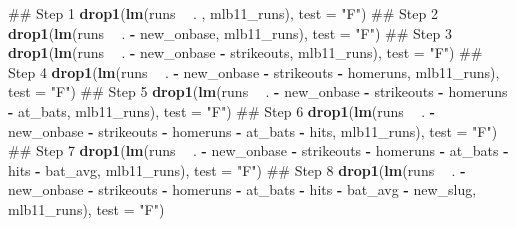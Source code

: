 \documentclass[]{book}
\newenvironment{Shaded}{\begin{snugshade}}{\end{snugshade}}
\newcommand{\KeywordTok}[1]{\textcolor[rgb]{0.13,0.29,0.53}{\textbf{#1}}}
\newcommand{\DataTypeTok}[1]{\textcolor[rgb]{0.13,0.29,0.53}{#1}}
\newcommand{\StringTok}[1]{\textcolor[rgb]{0.31,0.60,0.02}{#1}}
\newcommand{\OperatorTok}[1]{\textcolor[rgb]{0.81,0.36,0.00}{\textbf{#1}}}
\newcommand{\NormalTok}[1]{#1}
\theoremstyle{definition}
\theoremstyle{definition}
\theoremstyle{definition}
\theoremstyle{remark}
\begin{document}
\begin{Shaded}
\begin{Highlighting}[]
\NormalTok{## Step 1}
\KeywordTok{drop1}\NormalTok{(}\KeywordTok{lm}\NormalTok{(runs }\OperatorTok{~}\StringTok{ }\NormalTok{. , mlb11_runs), }\DataTypeTok{test =} \StringTok{"F"}\NormalTok{)}
\NormalTok{## Step 2}
\KeywordTok{drop1}\NormalTok{(}\KeywordTok{lm}\NormalTok{(runs }\OperatorTok{~}\StringTok{ }\NormalTok{. }\OperatorTok{-}\StringTok{ }\NormalTok{new_onbase, mlb11_runs), }\DataTypeTok{test =} \StringTok{"F"}\NormalTok{)}
\NormalTok{## Step 3}
\KeywordTok{drop1}\NormalTok{(}\KeywordTok{lm}\NormalTok{(runs }\OperatorTok{~}\StringTok{ }\NormalTok{. }\OperatorTok{-}\StringTok{ }\NormalTok{new_onbase }\OperatorTok{-}\StringTok{ }\NormalTok{strikeouts, mlb11_runs), }\DataTypeTok{test =} \StringTok{"F"}\NormalTok{)}
\NormalTok{## Step 4}
\KeywordTok{drop1}\NormalTok{(}\KeywordTok{lm}\NormalTok{(runs }\OperatorTok{~}\StringTok{ }\NormalTok{. }\OperatorTok{-}\StringTok{ }\NormalTok{new_onbase }\OperatorTok{-}\StringTok{ }\NormalTok{strikeouts }\OperatorTok{-}\StringTok{ }\NormalTok{homeruns, mlb11_runs), }\DataTypeTok{test =} \StringTok{"F"}\NormalTok{)}
\NormalTok{## Step 5}
\KeywordTok{drop1}\NormalTok{(}\KeywordTok{lm}\NormalTok{(runs }\OperatorTok{~}\StringTok{ }\NormalTok{. }\OperatorTok{-}\StringTok{ }\NormalTok{new_onbase }\OperatorTok{-}\StringTok{ }\NormalTok{strikeouts }\OperatorTok{-}\StringTok{ }\NormalTok{homeruns }\OperatorTok{-}\StringTok{ }\NormalTok{at_bats, mlb11_runs), }\DataTypeTok{test =} \StringTok{"F"}\NormalTok{)}
\NormalTok{## Step 6}
\KeywordTok{drop1}\NormalTok{(}\KeywordTok{lm}\NormalTok{(runs }\OperatorTok{~}\StringTok{ }\NormalTok{. }\OperatorTok{-}\StringTok{ }\NormalTok{new_onbase }\OperatorTok{-}\StringTok{ }\NormalTok{strikeouts }\OperatorTok{-}\StringTok{ }\NormalTok{homeruns }\OperatorTok{-}\StringTok{ }\NormalTok{at_bats }\OperatorTok{-}\StringTok{ }\NormalTok{hits, mlb11_runs), }\DataTypeTok{test =} \StringTok{"F"}\NormalTok{)}
\NormalTok{## Step 7}
\KeywordTok{drop1}\NormalTok{(}\KeywordTok{lm}\NormalTok{(runs }\OperatorTok{~}\StringTok{ }\NormalTok{. }\OperatorTok{-}\StringTok{ }\NormalTok{new_onbase }\OperatorTok{-}\StringTok{ }\NormalTok{strikeouts }\OperatorTok{-}\StringTok{ }\NormalTok{homeruns }\OperatorTok{-}\StringTok{ }\NormalTok{at_bats }\OperatorTok{-}\StringTok{ }\NormalTok{hits  }\OperatorTok{-}\StringTok{ }\NormalTok{bat_avg, mlb11_runs), }\DataTypeTok{test =} \StringTok{"F"}\NormalTok{)}
\NormalTok{## Step 8}
\KeywordTok{drop1}\NormalTok{(}\KeywordTok{lm}\NormalTok{(runs }\OperatorTok{~}\StringTok{ }\NormalTok{. }\OperatorTok{-}\StringTok{ }\NormalTok{new_onbase }\OperatorTok{-}\StringTok{ }\NormalTok{strikeouts }\OperatorTok{-}\StringTok{ }\NormalTok{homeruns }\OperatorTok{-}\StringTok{ }\NormalTok{at_bats }\OperatorTok{-}\StringTok{ }\NormalTok{hits  }\OperatorTok{-}\StringTok{ }\NormalTok{bat_avg }\OperatorTok{-}\StringTok{ }\NormalTok{new_slug, mlb11_runs), }\DataTypeTok{test =} \StringTok{"F"}\NormalTok{)}
\end{Highlighting}
\end{Shaded}
\end{document}
